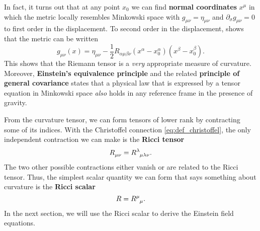 In fact, it turns out that at any point $x_0$ we can find \textbf{normal coordinates} $x^\mu$ in which the metric locally resembles Minkowski space with $g_{\mu \nu} = \eta_{\mu \nu}$ and $\partial_\sigma g_{\mu \nu} = 0$ to first order in the displacement.
To second order in the displacement, \cite{ref:metric_taylor_expansion} shows that the metric can be written
\begin{equation}
	g_{\mu \nu}(x) = \eta_{\mu \nu} - \frac12 R_{\alpha \mu \beta \nu} (x^\alpha - x_0^\alpha) (x^\beta - x_0^\beta) .
\end{equation}
This shows that the Riemann tensor is a \emph{very} appropriate measure of curvature.
Moreover, \textbf{Einstein's equivalence principle} and the related \textbf{principle of general covariance} states that a physical law that is expressed by a tensor equation in Minkowski space \emph{also} holds in any reference frame in the presence of gravity. \cite[chapter 4]{ref:weinberg_gravity}


From the curvature tensor, we can form tensors of lower rank by contracting some of its indices.
With the Christoffel connection \cref{eq:def_christoffel}, the only independent contraction we can make is the \textbf{Ricci tensor}
\begin{equation}
	R\indices{_\mu_\nu} = R\indices{^\lambda_\mu_\lambda_\nu} .
	\label{eq:def_ricci_tensor}
\end{equation}
The two other possible contractions either vanish or are related to the Ricci tensor.
Thus, the simplest scalar quantity we can form that says something about curvature is the \textbf{Ricci scalar}
\begin{equation}
	R = R\indices{^\mu_\mu} .
	\label{eq:def_ricci_scalar}
\end{equation}
In the next section, we will use the Ricci scalar to derive the Einstein field equations.




